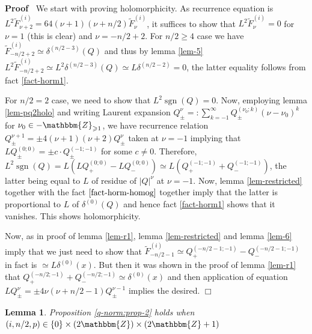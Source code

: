 \documentclass{article}
\newcommand{\tmop}[1]{\ensuremath{\operatorname{#1}}}
\newenvironment{proof}{\noindent\textbf{Proof\ }}{\hspace*{\fill}$\Box$\medskip}
\numberwithin{definition}{section}
\newtheorem{lemma}{Lemma}
\numberwithin{lemma}{section}
\numberwithin{proposition}{section}
{\theorembodyfont{\rmfamily}\newtheorem{remark}{Remark}
\numberwithin{remark}{section}
}
\begin{document}
\begin{proof}
  We start with proving holomorphicity. As recurrence equation is $L^2
  \tilde{F}_{\nu + 2}^{( i)} = 64 ( \nu + 1) ( \nu + n / 2) \tilde{F}_{\nu}^{(
  i)}$, it suffices to show that $L^2 \tilde{F}_{\nu}^{( i)} = 0$ for $\nu =
  1$ (this is clear) and $\nu = - n / 2 + 2$. For $n / 2 \geqslant 4$ case we
  have $\tilde{F}^{( i)}_{- n / 2 + 2} \simeq \delta^{( n / 2 - 3)} ( Q)$ and
  thus by lemma \ref{lem-5} $L^2 \tilde{F}^{( i)}_{- n / 2 + 2} \simeq L^2
  \delta^{( n / 2 - 3)} ( Q) \simeq L \delta^{( n / 2 - 2)} = 0$, the latter
  equality follows from fact \ref{fact-horm1}.
  
  For $n / 2 = 2$ case, we need to show that $L^2 \tmop{sgn} ( Q) = 0$. Now,
  employing lemma \ref{lem-pq2holo} and writing Laurent expansion
  $Q^{\nu}_{\pm} = : \sum_{k = - 1}^{\infty} Q_{\pm}^{( \nu_0 ; k)} ( \nu -
  \nu_0)^k$ for $\nu_0 \in -\mathbbm{Z}_{\geqslant 1}$, we have recurrence
  relation $Q_{\pm}^{\nu + 1} = \pm 4 ( \nu + 1) ( \nu + 2) Q_{\pm}^{\nu}$
  taken at $\nu = - 1$ implying that $L Q_{\pm}^{( 0 ; 0)} = \pm c \cdot
  Q_{\pm}^{( - 1 ; - 1)}$ for some $c \neq 0$. Therefore, $L^2 \tmop{sgn} ( Q)
  = L ( L Q_+^{( 0 ; 0)} - L Q_-^{( 0 ; 0)}) \simeq L ( Q_+^{( - 1 ; - 1)} +
  Q_-^{( - 1 ; - 1)})$, the latter being equal to $L$ of residue of $| Q
  |^{\nu}$ at $\nu = - 1$. Now, lemma \ref{lem-restricted} together with the
  fact $\ref{fact-horm-homog} $ together imply that the latter is proportional
  to $L$ of $\delta^{( 0)} ( Q)$ and hence fact \ref{fact-horm1} shows that it
  vanishes. This shows holomorphicity.
  
  Now, as in proof of lemma \ref{lem-r1}, lemma \ref{lem-restricted} and lemma
  \ref{lem-6} imply that we just need to show that $\tilde{F}_{- n / 2 - 1}^{(
  i)} \simeq Q_+^{( - n / 2 - 1 ; - 1)} - Q_-^{( - n / 2 - 1 ; - 1)}$ in fact
  is $\simeq L \delta^{( 0)} ( x)$. But then it was shown in the proof of
  lemma \ref{lem-r1} that $Q_+^{( - n / 2 ; - 1)} + Q_-^{( - n / 2 ; - 1)}
  \simeq \delta^{( 0)} ( x)$ and then application of equation $L Q_{\pm}^{\nu}
  = \pm 4 \nu ( \nu + n / 2 - 1) Q_{\pm}^{\nu - 1}$ implies the desired.
\end{proof}

\begin{lemma}
  \label{lem-r5}Proposition \ref{q-norm:prop-2} holds when $( i, n / 2, p) \in
  \{ 0 \} \times ( 2\mathbbm{Z}) \times ( 2\mathbbm{Z}+ 1)$
\end{lemma}
\end{document}
